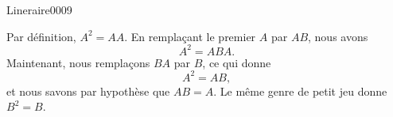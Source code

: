 \begin{corrige}{Lineraire0009}

	Par définition, $A^2=AA$. En remplaçant le premier $A$ par $AB$, nous avons
	\begin{equation}
		A^2=ABA.
	\end{equation}
	Maintenant, nous remplaçons $BA$ par $B$, ce qui donne
	\begin{equation}
		A^2=AB,
	\end{equation}
	et nous savons par hypothèse que $AB=A$. Le même genre de petit jeu donne $B^2=B$.

\end{corrige}
